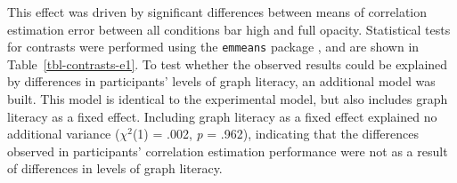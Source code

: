 \documentclass[../main.tex]{subfiles}
\begin{document}
This effect was driven by significant differences between means of
correlation estimation error between all conditions bar high and full
opacity. Statistical tests for contrasts were performed using the
\texttt{emmeans} package \cite{lenth_2024}, and are shown in
Table~\ref{tbl-contrasts-e1}. To test whether the observed results could
be explained by differences in participants' levels of graph literacy,
an additional model was built. This model is identical to the
experimental model, but also includes graph literacy as a fixed effect.
Including graph literacy as a fixed effect explained no additional
variance (\(\chi^2\)(1) = .002, \emph{p} = .962), indicating that the
differences observed in participants' correlation estimation performance
were not as a result of differences in levels of graph literacy.

\begin{table}

\caption{\label{tbl-efs-e1}Cohen's \textit{d} effect sizes (a) and
summary statistics (b) for levels of the opacity factor in Experiment 1.
Each effect size is compared to the reference level, full opacity (alpha
= 1).}

\begin{minipage}{0.50\linewidth}



\end{minipage}%
%
\begin{minipage}{0.50\linewidth}



\end{minipage}%

\end{table}%
\end{document}
